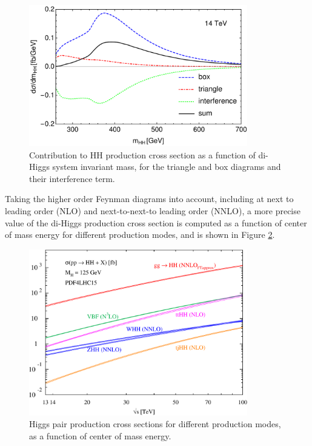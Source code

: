 \begin{figure}[H]
    \centering
    \includegraphics[width=0.85\textwidth]{Images/Theory/LO_contributions_ggF.pdf}
    \caption{Contribution to HH production cross section as a function of di-Higgs system invariant mass, for the triangle and box diagrams and their interference term.}
    \label{fig:LOXS_Contributions}
\end{figure}

Taking the higher order Feynman diagrams into account, including at next to leading order (NLO) and next-to-next-to leading order (NNLO), a more precise value of the di-Higgs production cross section is computed as a function of center of mass energy for different production modes, and is shown in Figure \ref{fig:ProductionModeXSs}. 

\begin{figure}[H]
    \centering
    \includegraphics[width=0.85\textwidth]{Images/Theory/cxn_HH.pdf}
    \caption{Higgs pair production cross sections for different production modes, as a function of center of mass energy.}
    \label{fig:ProductionModeXSs}
\end{figure}

